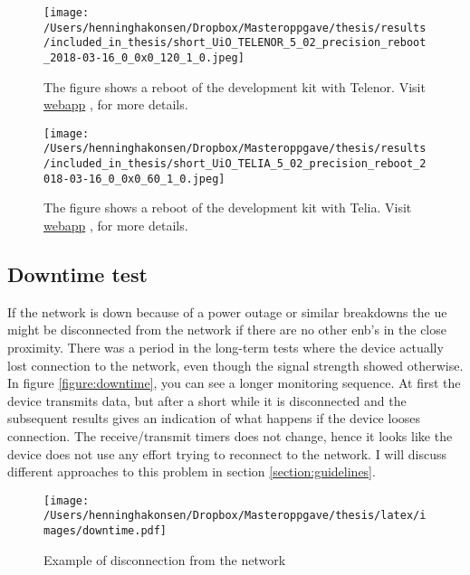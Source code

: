 \documentclass[USenglish]{ifimaster}  %
\begin{document}
\begin{figure}[H]
  \centering
  \texttt{[image: /Users/henninghakonsen/Dropbox/Masteroppgave/thesis/results/included\_in\_thesis/short\_UiO\_TELENOR\_5\_02\_precision\_reboot\_2018-03-16\_0\_0x0\_120\_1\_0.jpeg]}
  \caption[Short-term test - device reboot, Telenor]{The figure shows a reboot of the development kit with Telenor. Visit \href{http://158.39.77.97:9000/\#/results/UiO\_TELENOR\_5.02\_precision\_reboot\_2018-03-16\_0\_0x0\_120\_1\_0}{webapp} \cite{online:result9}, for more details.}
  \label{figure:telenor_reboot}
\end{figure}

\begin{figure}[H]
  \centering
  \texttt{[image: /Users/henninghakonsen/Dropbox/Masteroppgave/thesis/results/included\_in\_thesis/short\_UiO\_TELIA\_5\_02\_precision\_reboot\_2018-03-16\_0\_0x0\_60\_1\_0.jpeg]}
  \caption[Short-term test - device reboot, Telia]{The figure shows a reboot of the development kit with Telia. Visit \href{http://158.39.77.97:9000/\#/results/UiO\_TELIA\_5.02\_precision\_reboot\_2018-03-16\_0\_0x0\_60\_1\_0}{webapp} \cite{online:result10}, for more details.}
  \label{figure:telia_reboot}
\end{figure}

\subsection{Downtime test} \label{ssection:downtimetest}
If the network is down because of a power outage or similar breakdowns the \acrshort{ue} might be disconnected from the network if there are no other \acrshort{enb}'s in the close proximity. There was a period in the long-term tests where the device actually lost connection to the network, even though the signal strength showed otherwise. In figure \vref{figure:downtime}, you can see a longer monitoring sequence. At first the device transmits data, but after a short while it is disconnected and the subsequent results gives an indication of what happens if the device looses connection. The receive/transmit timers does not change, hence it looks like the device does not use any effort trying to reconnect to the network. I will discuss different approaches to this problem in section \vref{section:guidelines}.

\begin{figure}[H]
  \centering
  \texttt{[image: /Users/henninghakonsen/Dropbox/Masteroppgave/thesis/latex/images/downtime.pdf]}
  \caption[Short-term test - downtime]{Example of disconnection from the network}
  \label{figure:downtime}
\end{figure}
\end{document}
